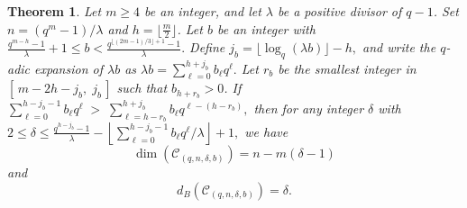 \documentclass[journal,onecolumn]{IEEEtran}
\newtheorem{theorem}{Theorem}
\begin{document}
\begin{theorem}
Let $m \ge 4$ be an integer, and let $\lambda$ be a positive divisor of $q-1$. Set $n = (q^m-1)/\lambda$ and  $h=\lfloor \frac{m}{2}\rfloor$. 
Let $b$ be an integer with 
$
   \frac{q^{m-h}-1}{\lambda}+1 \le b < \frac{q^{\lfloor (2m-1)/3 \rfloor +1}-1}{\lambda}.
$    
Define
$
  j_b = \lfloor \log_q (\lambda b) \rfloor - h,
$
and write the $q$-adic expansion of $\lambda b$ as
$
  \lambda b = \sum\limits_{\ell=0}^{h+j_b} b_\ell q^\ell.
$
Let $r_b$ be the smallest integer in $[\,m-2h-j_b,\; j_b\,]$ such that $b_{h+r_b} > 0$. If
$
  \sum\limits_{\ell=0}^{h-j_b-1} b_\ell q^\ell
   \;>\;
  \sum\limits_{\ell=h-r_b}^{h+j_b} b_\ell q^{\ell-(h-r_b)},
$
then for any integer $\delta$ with
$
   2 \le \delta \le 
   \frac{q^{h-j_b}-1}{\lambda}
   - \left\lfloor 
\sum\limits_{\ell=0}^{h-j_b-1} b_\ell q^\ell/ \lambda
     \right\rfloor
   + 1,
$
we have
\begin{equation}\label{baobao}
   \dim(\mathcal{C}_{(q,n,\delta,b)}) = n - m(\delta-1)
\end{equation}
and
\begin{equation}\label{baobao2}
   d_B(\mathcal{C}_{(q,n,\delta,b)}) = \delta.
\end{equation}
\end{theorem}
\end{document}
